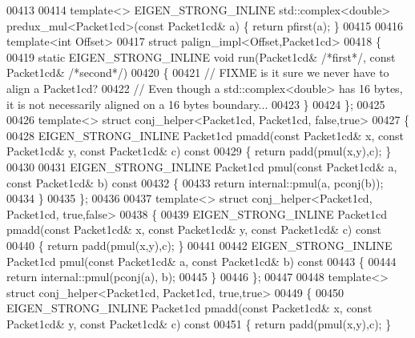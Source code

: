 \begin{DoxyCode}
00413 
00414 \textcolor{keyword}{template}<> EIGEN\_STRONG\_INLINE std::complex<double> predux\_mul<Packet1cd>(\textcolor{keyword}{const} Packet1cd& a) \{ \textcolor{keywordflow}{return} 
      pfirst(a); \}
00415 
00416 \textcolor{keyword}{template}<\textcolor{keywordtype}{int} Offset>
00417 \textcolor{keyword}{struct }palign\_impl<Offset,Packet1cd>
00418 \{
00419   \textcolor{keyword}{static} EIGEN\_STRONG\_INLINE \textcolor{keywordtype}{void} run(Packet1cd& \textcolor{comment}{/*first*/}, \textcolor{keyword}{const} Packet1cd& \textcolor{comment}{/*second*/})
00420   \{
00421     \textcolor{comment}{// FIXME is it sure we never have to align a Packet1cd?}
00422     \textcolor{comment}{// Even though a std::complex<double> has 16 bytes, it is not necessarily aligned on a 16 bytes
       boundary...}
00423   \}
00424 \};
00425 
00426 \textcolor{keyword}{template}<> \textcolor{keyword}{struct }conj\_helper<Packet1cd, Packet1cd, false,true>
00427 \{
00428   EIGEN\_STRONG\_INLINE Packet1cd pmadd(\textcolor{keyword}{const} Packet1cd& x, \textcolor{keyword}{const} Packet1cd& y, \textcolor{keyword}{const} Packet1cd& c)\textcolor{keyword}{ const}
00429 \textcolor{keyword}{  }\{ \textcolor{keywordflow}{return} padd(pmul(x,y),c); \}
00430 
00431   EIGEN\_STRONG\_INLINE Packet1cd pmul(\textcolor{keyword}{const} Packet1cd& a, \textcolor{keyword}{const} Packet1cd& b)\textcolor{keyword}{ const}
00432 \textcolor{keyword}{  }\{
00433     \textcolor{keywordflow}{return} internal::pmul(a, pconj(b));
00434   \}
00435 \};
00436 
00437 \textcolor{keyword}{template}<> \textcolor{keyword}{struct }conj\_helper<Packet1cd, Packet1cd, true,false>
00438 \{
00439   EIGEN\_STRONG\_INLINE Packet1cd pmadd(\textcolor{keyword}{const} Packet1cd& x, \textcolor{keyword}{const} Packet1cd& y, \textcolor{keyword}{const} Packet1cd& c)\textcolor{keyword}{ const}
00440 \textcolor{keyword}{  }\{ \textcolor{keywordflow}{return} padd(pmul(x,y),c); \}
00441 
00442   EIGEN\_STRONG\_INLINE Packet1cd pmul(\textcolor{keyword}{const} Packet1cd& a, \textcolor{keyword}{const} Packet1cd& b)\textcolor{keyword}{ const}
00443 \textcolor{keyword}{  }\{
00444     \textcolor{keywordflow}{return} internal::pmul(pconj(a), b);
00445   \}
00446 \};
00447 
00448 \textcolor{keyword}{template}<> \textcolor{keyword}{struct }conj\_helper<Packet1cd, Packet1cd, true,true>
00449 \{
00450   EIGEN\_STRONG\_INLINE Packet1cd pmadd(\textcolor{keyword}{const} Packet1cd& x, \textcolor{keyword}{const} Packet1cd& y, \textcolor{keyword}{const} Packet1cd& c)\textcolor{keyword}{ const}
00451 \textcolor{keyword}{  }\{ \textcolor{keywordflow}{return} padd(pmul(x,y),c); \}

\end{DoxyCode}
